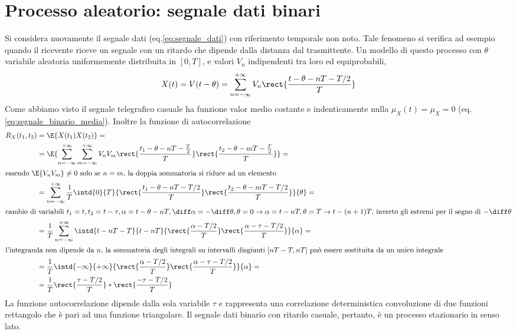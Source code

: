 \section[Processo aleatorio con riferimento temporale aleatorio]{Processo aleatorio: segnale dati binari}
Si considera nuovamente il segnale dati (eq.\ref{eq:segnale_dati}) con riferimento temporale non noto. Tale fenomeno si verifica ad esempio quando il ricevente riceve un segnale con un ritardo che dipende dalla distanza dal trasmittente. Un modello di questo processo con $\theta$ variabile aleatoria uniformemente distribuita in $[0,T]$, e valori $V_n$ indipendenti tra loro ed equiprobabili,
\[
	X(t)=V(t-\theta)=\sum_{n=-\infty}^{+\infty}V_n\rect{\frac{t-\theta-n T-T/2}{T}}
\]
Come abbiamo visto il segnale telegrafico casuale ha funzione valor medio costante e indenticamente nulla $\mu_X(t)=\mu_X=0$ (eq.\ref{eq:segnale_binario_media}).
Inoltre la funzione di autocorrelazione
\[
\begin{split}
	R_X(t_1,t_2)&=\E{X(t_1)X(t_2)}=\\
	&=\E{\sum_{n=-\infty}^{+\infty}\sum_{m=-\infty}^{+\infty}V_n V_m\rect{\frac{t_1-\theta-n T-\frac{T}{2}}{T}}\rect{\frac{t_2-\theta-m T-\frac{T}{2}}{T}}}=\\
\intertext{essendo $\E{V_nV_m}\neq 0$ solo se $n=m$, la doppia sommatoria si riduce ad un elemento}
	&=\sum_{n=-\infty}^{+\infty}\frac{1}{T}\intd{0}{T}{\rect{\frac{t_1-\theta-n T-T/2}{T}}\rect{\frac{t_2-\theta-m T-T/2}{T}}}{\theta}=\\
\intertext{cambio di variabili $t_1=t, t_2=t-\tau, \alpha=t-\theta-n T,\diff\alpha=-\diff\theta, \theta=0\to\alpha=t-nT, \theta=T\to t-(n+1)T$, inverto gli estremi per il segno di $-\diff\theta$}
	&=\frac{1}{T}\sum_{n=-\infty}^{+\infty}\intd{t-n T-T}{t-n T}{\rect{\frac{\alpha-T/2}{T}}\rect{\frac{\alpha-\tau-T/2}{T}}}{\alpha}=\\
\intertext{l'integranda non dipende da $n$, la sommatoria degli integrali su intervalli disgiunti $[n T-T,n T]$ può essere sostituita da un unico integrale}
	&=\frac{1}{T}\intd{-\infty}{+\infty}{\rect{\frac{\alpha-T/2}{T}}\rect{\frac{\alpha-\tau-T/2}{T}}}{\alpha}=\\
	&=\frac{1}{T}\rect{\frac{\tau-T/2}{T}}\ast\rect{\frac{-\tau-T/2}{T}}
\end{split}
\]
La funzione autocorrelazione dipende dalla sola variabile $\tau$ e rappresenta una correlazione deterministica convoluzione di due funzioni rettangolo che è pari ad una funzione triangolare.
Il segnale dati binario con ritardo casuale, pertanto, è un processo stazionario in senso lato.

